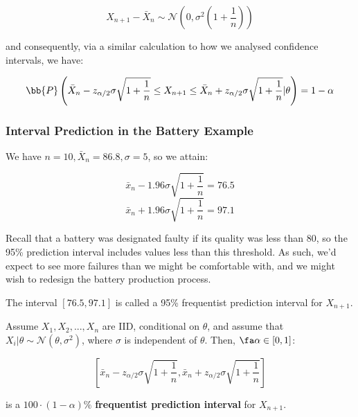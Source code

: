 \documentclass[a4paper]{article}
\begin{document}
            \[
                X_{n + 1} - \bar X_n \sim \mathcal{N}\left(0, \sigma^2\left(1 +
                \frac{1}{n}\right)\right)
            \]

            and consequently, via a similar calculation to how we analysed
            confidence intervals, we have:

            \[
                \bb{P}\left(\bar X_n - z_{\alpha/2} \sigma\sqrt{1 + \frac{1}{n}}
                \leq X_{n + 1} \leq \bar X_{n} + z_{\alpha/2} \sigma\sqrt{1 +
                \frac{1}{n}} | \theta\right) = 1 - \alpha
            \]

            \subsubsection{Interval Prediction in the Battery Example}
                We have $n = 10, \bar X_n = 86.8, \sigma = 5$, so we attain:

                \[
                    \bar x_n - 1.96 \sigma \sqrt{1 + \frac{1}{n}} = 76.5
                \]
                \[
                    \bar x_n + 1.96 \sigma \sqrt{1 + \frac{1}{n}} = 97.1
                \]

                Recall that a battery was designated faulty if its quality was
                less than 80, so the 95\% prediction interval includes values
                less than this threshold. As such, we'd expect to see more
                failures than we might be comfortable with, and we might wish to
                redesign the battery production process.

                The interval $[76.5, 97.1]$ is called a 95\% frequentist
                prediction interval for $X_{n + 1}$.

                \begin{definition}
                    Assume $X_1, X_2, ..., X_n$ are IID, conditional on
                    $\theta$, and assume that $X_i | \theta \sim \mathcal{N}
                    (\theta, \sigma^2)$, where $\sigma$ is independent of
                    $\theta$. Then, $\fa \alpha \in [0, 1]$:

                    \[
                        \left[\bar x_n - z_{\alpha/2}\sigma\sqrt{1 +
                        \frac{1}{n}}, \bar x_n + z_{\alpha/2} \sigma\sqrt{1 +
                        \frac{1}{n}}\right]
                    \]

                    is a $100 \cdot (1 - \alpha)\%$ \textbf{frequentist
                    prediction interval} for $X_{n + 1}$.
                \end{definition}
\end{document}

